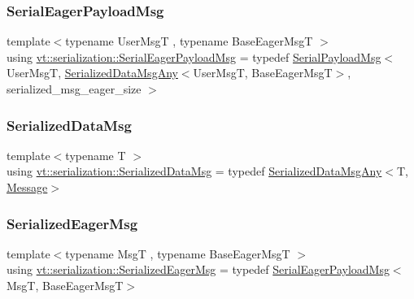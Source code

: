 \mbox{\label{namespacevt_1_1serialization_af3a0dfd4a0d3fa09c75edba0dc1b7fec}} 
\subsubsection{\texorpdfstring{Serial\+Eager\+Payload\+Msg}{SerialEagerPayloadMsg}}
{\footnotesize\ttfamily template$<$typename User\+MsgT , typename Base\+Eager\+MsgT $>$ \\
using \hyperlink{namespacevt_1_1serialization_af3a0dfd4a0d3fa09c75edba0dc1b7fec}{vt\+::serialization\+::\+Serial\+Eager\+Payload\+Msg} = typedef \hyperlink{structvt_1_1serialization_1_1_serial_payload_msg}{Serial\+Payload\+Msg}$<$ User\+MsgT, \hyperlink{structvt_1_1serialization_1_1_serialized_data_msg_any}{Serialized\+Data\+Msg\+Any}$<$User\+MsgT, Base\+Eager\+MsgT$>$, serialized\+\_\+msg\+\_\+eager\+\_\+size $>$}

\mbox{\label{namespacevt_1_1serialization_a56d2aee859dc963c2b5fad82649dd79a}} 
\subsubsection{\texorpdfstring{Serialized\+Data\+Msg}{SerializedDataMsg}}
{\footnotesize\ttfamily template$<$typename T $>$ \\
using \hyperlink{namespacevt_1_1serialization_a56d2aee859dc963c2b5fad82649dd79a}{vt\+::serialization\+::\+Serialized\+Data\+Msg} = typedef \hyperlink{structvt_1_1serialization_1_1_serialized_data_msg_any}{Serialized\+Data\+Msg\+Any}$<$T, \hyperlink{namespacevt_a3a3ddfef40b4c90915fa43cdd5f129ea}{Message}$>$}

\mbox{\label{namespacevt_1_1serialization_ac8b37425f8316a800cdb0b0f0f8a6438}} 
\subsubsection{\texorpdfstring{Serialized\+Eager\+Msg}{SerializedEagerMsg}}
{\footnotesize\ttfamily template$<$typename MsgT , typename Base\+Eager\+MsgT $>$ \\
using \hyperlink{namespacevt_1_1serialization_ac8b37425f8316a800cdb0b0f0f8a6438}{vt\+::serialization\+::\+Serialized\+Eager\+Msg} = typedef \hyperlink{namespacevt_1_1serialization_af3a0dfd4a0d3fa09c75edba0dc1b7fec}{Serial\+Eager\+Payload\+Msg}$<$MsgT, Base\+Eager\+MsgT$>$}

